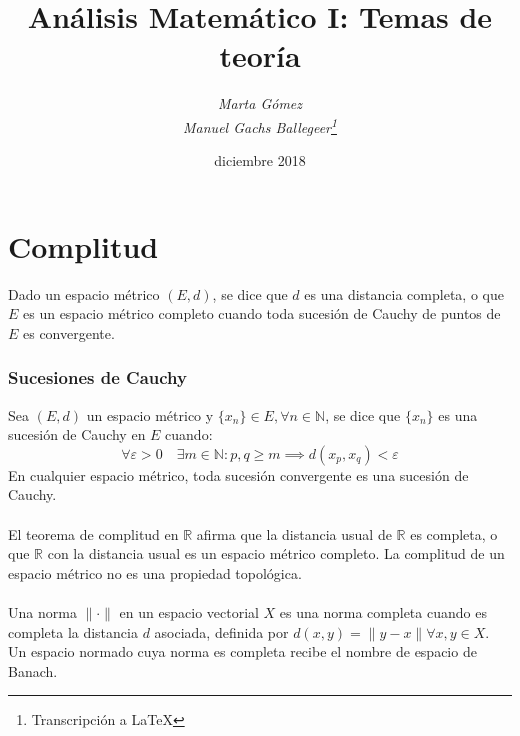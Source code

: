 \documentclass[11pt,titlepage,a4paper]{article}
\theoremstyle{definition}
\begin{document}
\title{\Huge{\textbf{Análisis Matemático I: Temas de teoría}}}
\author{\textit{Marta Gómez}\\ \textit{Manuel Gachs Ballegeer\thanks{Transcripción a \LaTeX}}}
\date{diciembre 2018}
\maketitle

\tableofcontents
\clearpage

\section{Complitud}

Dado un espacio métrico $(E,d)$, se dice que $d$ es una distancia completa, 
o que $E$ es un espacio métrico completo cuando toda sucesión de Cauchy de 
puntos de $E$ es convergente.

\subsubsection*{Sucesiones de Cauchy}

Sea $(E,d)$ un espacio métrico y $\{x_n\}\in E,\forall n\in\mathbb{N}$, se 
dice que $\{x_n\}$ es una sucesión de Cauchy en $E$ cuando:
\begin{equation*}
\forall\varepsilon>0\quad\exists m\in\mathbb{N}:p,q\geq m\implies d(x_p,x_q)<\varepsilon
\end{equation*}
En cualquier espacio métrico, toda sucesión convergente es una sucesión de Cauchy.
\\\\
El teorema de complitud en $\mathbb{R}$ afirma que la distancia usual de 
$\mathbb{R}$ es completa, o que $\mathbb{R}$ con la distancia usual es un
espacio métrico completo. La complitud de un espacio métrico no es una 
propiedad topológica.
\\\\
Una norma $\|\cdot\|$ en un espacio vectorial $X$ es una norma completa cuando
es completa la distancia $d$ asociada, definida por $d(x,y)=\|y-x\|\forall x,y\in X$.
Un espacio normado cuya norma es completa recibe el nombre de espacio de Banach.
\end{document}
